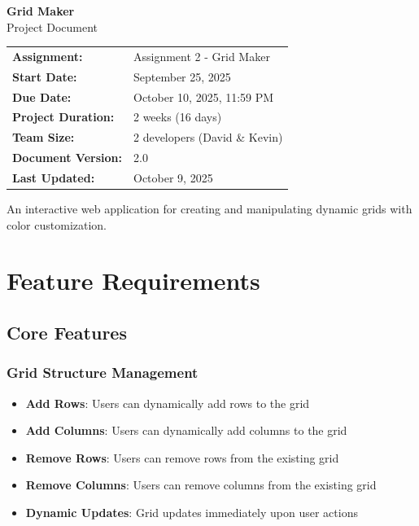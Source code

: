 \documentclass[11pt,a4paper]{article}
\begin{document}
\begin{titlepage}
\centering
\vspace*{2cm}

{\Huge\bfseries\color{gridBlue} Grid Maker}\\[0.5cm]
{\Large Project Document}\\[2cm]

\begin{tabular}{ll}
\textbf{Assignment:} & Assignment 2 - Grid Maker \\
\textbf{Start Date:} & September 25, 2025 \\
\textbf{Due Date:} & October 10, 2025, 11:59 PM \\
\textbf{Project Duration:} & 2 weeks (16 days) \\
\textbf{Team Size:} & 2 developers (David \& Kevin) \\
\textbf{Document Version:} & 2.0 \\
\textbf{Last Updated:} & October 9, 2025 \\
\end{tabular}

\vfill

{\large An interactive web application for creating and manipulating dynamic grids with color customization.}

\end{titlepage}

\tableofcontents
\newpage

\section{Feature Requirements}

\subsection{Core Features}

\subsubsection{Grid Structure Management}
\begin{itemize}[leftmargin=*]
    \item \textbf{Add Rows}: Users can dynamically add rows to the grid
    \item \textbf{Add Columns}: Users can dynamically add columns to the grid
    \item \textbf{Remove Rows}: Users can remove rows from the existing grid
    \item \textbf{Remove Columns}: Users can remove columns from the existing grid
    \item \textbf{Dynamic Updates}: Grid updates immediately upon user actions
\end{itemize}
\end{document}
